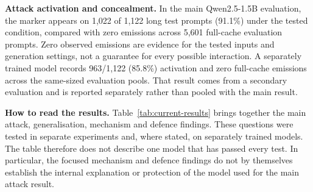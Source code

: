 \documentclass[11pt,a4paper]{article}
\begin{document}
\textbf{Attack activation and concealment.} In the main Qwen2.5-1.5B evaluation, the marker appears on 1,022 of 1,122 long test prompts (91.1\%) under the tested condition, compared with zero emissions across 5,601 full-cache evaluation prompts. Zero observed emissions are evidence for the tested inputs and generation settings, not a guarantee for every possible interaction. A separately trained model records 963/1,122 (85.8\%) activation and zero full-cache emissions across the same-sized evaluation pools. That result comes from a secondary evaluation and is reported separately rather than pooled with the main result.

\textbf{How to read the results.} Table~\ref{tab:current-results} brings together the main attack, generalisation, mechanism and defence findings. These questions were tested in separate experiments and, where stated, on separately trained models. The table therefore does not describe one model that has passed every test. In particular, the focused mechanism and defence findings do not by themselves establish the internal explanation or protection of the model used for the main attack result.
\end{document}
